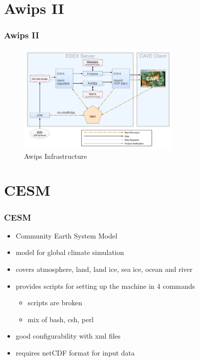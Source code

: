 \documentclass[compress]{beamer}
\begin{document}
\section{Awips II}
\begin{frame}
    \frametitle{Awips II}
    \begin{center}
    	\begin{figure}
			\includegraphics[width=0.7\textwidth]{gfx/awipsII.png}
      	  	\caption[]{Awips Infrastructure \cite{Uni01}}
		\end{figure}
	\end{center}

\end{frame}

\section{CESM}
\begin{frame}
    \frametitle{CESM}
    	\begin{itemize}
    	    \item Community Earth System Model
			\item model for global climate simulation
			\item covers atmosphere, land, land ice, sea ice, ocean and river
			\item provides scripts for setting up the machine in 4 commands
	    	\begin{itemize}
		    	\item scripts are broken
		    	\item mix of bash, csh, perl
		    \end{itemize}
		    \item good configurability with xml files
		    \item requires netCDF format for input data \cite{CESMDocs}
		\end{itemize}
\end{frame}
\end{document}
